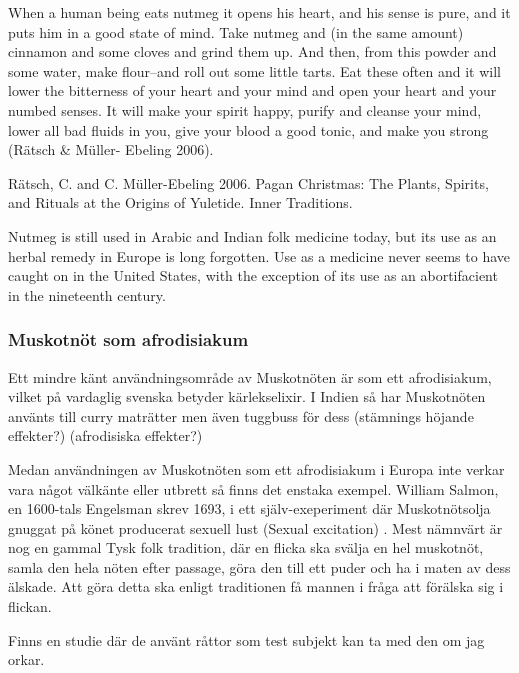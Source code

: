 \begin{displayquote}

When a human being eats nutmeg it opens his heart, and his sense is pure, and it
puts him in a good state of mind. Take nutmeg and (in the same amount) cinnamon
and some cloves and grind them up. And then, from this powder and some water,
make flour--and roll out some little tarts. Eat these often and it will lower the
bitterness of your heart and your mind and open your heart and your numbed
senses. It will make your spirit happy, purify and cleanse your mind, lower all bad
fluids in you, give your blood a good tonic, and make you strong (Rätsch & Müller-
Ebeling 2006).

Rätsch, C. and C. Müller-Ebeling 2006. Pagan Christmas: The Plants, Spirits, and Rituals at the Origins of
Yuletide. Inner Traditions.

\end{displayquote}

Nutmeg is still used in Arabic and Indian folk medicine today, but its use as an herbal remedy in
Europe is long forgotten. Use as a medicine never seems to have caught on in the United
States, with the exception of its use as an abortifacient in the nineteenth century.



\subsubsection{Muskotnöt som afrodisiakum}

Ett mindre känt användningsområde av Muskotnöten är som ett afrodisiakum, vilket på vardaglig svenska betyder
kärlekselixir.
I Indien så har Muskotnöten använts till curry maträtter men även tuggbuss för dess (stämnings höjande effekter?) (afrodisiska effekter?) \cite{ratsch2005encyclopedia}

Medan användningen av Muskotnöten som ett afrodisiakum i Europa inte verkar vara något välkänte eller utbrett så
finns det enstaka exempel. William Salmon, en 1600-tals Engelsman skrev 1693, i ett själv-exeperiment där
Muskotnötsolja gnuggat på könet producerat sexuell lust (Sexual excitation) \cite{RudgleyR}.
Mest nämnvärt är nog en gammal Tysk folk tradition, där en flicka ska svälja en hel muskotnöt, samla den hela nöten
efter passage, göra den till ett puder och ha i maten av dess älskade. Att göra detta ska enligt traditionen
få mannen i fråga att förälska sig i flickan. \cite{ratsch2005encyclopedia}

Finns en studie där de använt råttor som test subjekt kan ta med den om jag orkar.


